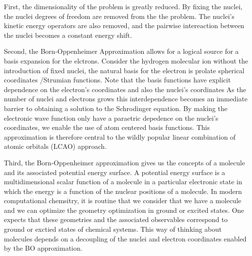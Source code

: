 First, the dimensionality of the problem is greatly reduced.
By fixing the nuclei, the nuclei degrees of freedom are removed from the the problem.
The nuclei's kinetic energy operators are also removed, and the pairwise intereaction between the nuclei becomes a constant energy shift.

Second, the Born-Oppenheimer Approximation allows for a logical source for a basis expansion for the elctrons.
Consider the hydrogen molecular ion without the introduction of fixed nuclei, the natural basis for the electron is prolate spherical coordinates /Strumian functions.
Note that the basis functions have explicit dependence on the electron's coordinates and also the nuclei's coordinates
As the number of nuclei and electrons grows this interdependence becomes an immediate barrier to obtaining a solution to the Schrodinger equation.
By making the electronic wave function only have a paraetric depedence on the nuclei's coordinates, we enable the use of atom centered basis functions.
This approximation is therefore central to the wildly popular linear combination of atomic orbitals (LCAO) approach.

Third, the Born-Oppenheimer approximation gives us the concepts of a molecule and its associated potential energy surface.
A potential energy surface is a multidimensional scalar function of a molecule in a particular electronic state in which the energy is a function of the nuclear positions of a molecule.
In modern computational chemsitry, it is routine that we consider that we have a molecule and we can optimize the geometry optimization in ground or excited states.
One expects that these geometries and the associated observables correspond to ground or exctied states of chemical systems.
This way of thinking about molecules depends on a decoupling of the nuclei and electron coordinates enabled by the BO approximation.
